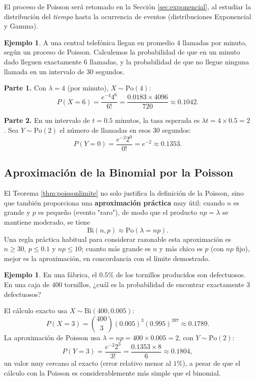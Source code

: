 \documentclass[11pt,a4paper]{article}
\theoremstyle{plain}
\theoremstyle{definition}
\newtheorem{ejemplo}[teorema]{Ejemplo}
\theoremstyle{remark}
\begin{document}
El proceso de Poisson será retomado en la Sección \ref{sec:exponencial}, al estudiar la distribución del \emph{tiempo} hasta la ocurrencia de eventos (distribuciones Exponencial y Gamma).

\begin{ejemplo}
A una central telefónica llegan en promedio $4$ llamadas por minuto, según un proceso de Poisson. Calculemos la probabilidad de que en un minuto dado lleguen exactamente $6$ llamadas, y la probabilidad de que no llegue ninguna llamada en un intervalo de $30$ segundos.

\textbf{Parte 1.} Con $\lambda=4$ (por minuto), $X\sim\text{Po}(4)$:
$$P(X=6)=\frac{e^{-4}4^6}{6!}=\frac{0.0183\times4096}{720}\approx0.1042.$$

\textbf{Parte 2.} En un intervalo de $t=0.5$ minutos, la tasa esperada es $\lambda t=4\times0.5=2$. Sea $Y\sim\text{Po}(2)$ el número de llamadas en esos $30$ segundos:
$$P(Y=0)=\frac{e^{-2}2^0}{0!}=e^{-2}\approx0.1353.$$
\end{ejemplo}

\subsection{Aproximación de la Binomial por la Poisson}

El Teorema \ref{thm:poissonlimite} no solo justifica la definición de la Poisson, sino que también proporciona una \textbf{aproximación práctica} muy útil: cuando $n$ es grande y $p$ es pequeño (evento "raro"), de modo que el producto $np=\lambda$ se mantiene moderado, se tiene
$$\text{Bi}(n,p)\approx\text{Po}(\lambda=np).$$
Una regla práctica habitual para considerar razonable esta aproximación es $n\ge30$, $p\le0.1$ y $np\le10$; cuanto más grande es $n$ y más chico es $p$ (con $np$ fijo), mejor es la aproximación, en concordancia con el límite demostrado.

\begin{ejemplo}
En una fábrica, el $0.5\%$ de los tornillos producidos son defectuosos. En una caja de $400$ tornillos, ¿cuál es la probabilidad de encontrar exactamente $3$ defectuosos?

El cálculo exacto usa $X\sim\text{Bi}(400,0.005)$:
$$P(X=3)=\binom{400}{3}(0.005)^3(0.995)^{397}\approx0.1789.$$
La aproximación de Poisson usa $\lambda=np=400\times0.005=2$, con $Y\sim\text{Po}(2)$:
$$P(Y=3)=\frac{e^{-2}2^3}{3!}=\frac{0.1353\times8}{6}\approx0.1804,$$
un valor muy cercano al exacto (error relativo menor al $1\%$), a pesar de que el cálculo con la Poisson es considerablemente más simple que el binomial.
\end{ejemplo}
\end{document}
